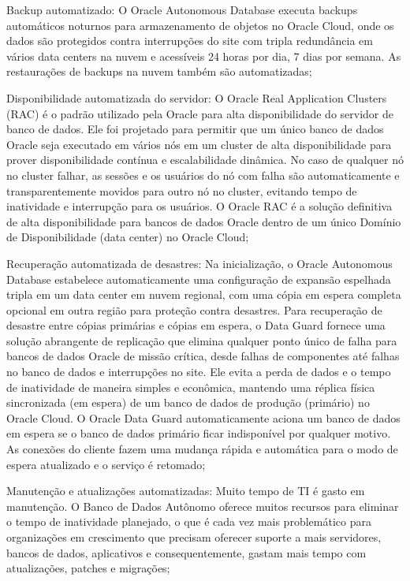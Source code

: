 \begin{alineas} 
\item Backup automatizado: O Oracle Autonomous Database executa backups automáticos noturnos para armazenamento de objetos no Oracle Cloud, onde os dados são protegidos contra interrupções do site com tripla redundância em vários data centers na nuvem e acessíveis 24 horas por dia, 7 dias por semana. As restaurações de backups na nuvem também são automatizadas;

\item Disponibilidade automatizada do servidor: O Oracle Real Application Clusters (RAC) é o padrão utilizado pela Oracle para alta disponibilidade do servidor de banco de dados. Ele foi projetado para permitir que um único banco de dados Oracle seja executado em vários nós em um cluster de alta disponibilidade para prover disponibilidade contínua e escalabilidade dinâmica. No caso de qualquer nó no cluster falhar, as sessões e os usuários do nó com falha são automaticamente e transparentemente movidos para outro nó no cluster, evitando tempo de inatividade e interrupção para os usuários. O Oracle RAC é a solução definitiva de alta disponibilidade para bancos de dados Oracle dentro de um único Domínio de Disponibilidade (data center) no Oracle Cloud;

\item Recuperação automatizada de desastres: Na inicialização, o Oracle Autonomous Database estabelece automaticamente uma configuração de expansão espelhada tripla em um data center em nuvem regional, com uma cópia em espera completa opcional em outra região para proteção contra desastres. Para recuperação de desastre entre cópias primárias e cópias em espera, o Data Guard fornece uma solução abrangente de replicação que elimina qualquer ponto único de falha para bancos de dados Oracle de missão crítica, desde falhas de componentes até falhas no banco de dados e interrupções no site. Ele evita a perda de dados e o tempo de inatividade de maneira simples e econômica, mantendo uma réplica física sincronizada (em espera) de um banco de dados de produção (primário) no Oracle Cloud. O Oracle Data Guard automaticamente aciona um banco de dados em espera se o banco de dados primário ficar indisponível por qualquer motivo. As conexões do cliente fazem uma mudança rápida e automática para o modo de espera atualizado e o serviço é retomado;

\item Manutenção e atualizações automatizadas: Muito tempo de TI é gasto em manutenção. O Banco de Dados Autônomo oferece muitos recursos para eliminar o tempo de inatividade planejado, o que é cada vez mais problemático para organizações em crescimento que precisam oferecer suporte a mais servidores, bancos de dados, aplicativos e consequentemente, gastam mais tempo com atualizações, patches e migrações;


\end{alineas}
